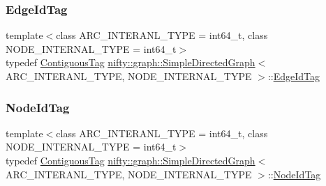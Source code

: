 \subsubsection{\texorpdfstring{Edge\+Id\+Tag}{EdgeIdTag}}
{\footnotesize\ttfamily template$<$class A\+R\+C\+\_\+\+I\+N\+T\+E\+R\+A\+N\+L\+\_\+\+T\+Y\+PE  = int64\+\_\+t, class N\+O\+D\+E\+\_\+\+I\+N\+T\+E\+R\+N\+A\+L\+\_\+\+T\+Y\+PE  = int64\+\_\+t$>$ \\
typedef \hyperlink{structnifty_1_1graph_1_1ContiguousTag}{Contiguous\+Tag} \hyperlink{classnifty_1_1graph_1_1SimpleDirectedGraph}{nifty\+::graph\+::\+Simple\+Directed\+Graph}$<$ A\+R\+C\+\_\+\+I\+N\+T\+E\+R\+A\+N\+L\+\_\+\+T\+Y\+PE, N\+O\+D\+E\+\_\+\+I\+N\+T\+E\+R\+N\+A\+L\+\_\+\+T\+Y\+PE $>$\+::\hyperlink{classnifty_1_1graph_1_1SimpleDirectedGraph_ad0523e96e29a6feae5c9c003c2dc9e37}{Edge\+Id\+Tag}}

\mbox{\label{classnifty_1_1graph_1_1SimpleDirectedGraph_a32f9f0f4beaa2cada708f8a51189a96b}} 
\subsubsection{\texorpdfstring{Node\+Id\+Tag}{NodeIdTag}}
{\footnotesize\ttfamily template$<$class A\+R\+C\+\_\+\+I\+N\+T\+E\+R\+A\+N\+L\+\_\+\+T\+Y\+PE  = int64\+\_\+t, class N\+O\+D\+E\+\_\+\+I\+N\+T\+E\+R\+N\+A\+L\+\_\+\+T\+Y\+PE  = int64\+\_\+t$>$ \\
typedef \hyperlink{structnifty_1_1graph_1_1ContiguousTag}{Contiguous\+Tag} \hyperlink{classnifty_1_1graph_1_1SimpleDirectedGraph}{nifty\+::graph\+::\+Simple\+Directed\+Graph}$<$ A\+R\+C\+\_\+\+I\+N\+T\+E\+R\+A\+N\+L\+\_\+\+T\+Y\+PE, N\+O\+D\+E\+\_\+\+I\+N\+T\+E\+R\+N\+A\+L\+\_\+\+T\+Y\+PE $>$\+::\hyperlink{classnifty_1_1graph_1_1SimpleDirectedGraph_a32f9f0f4beaa2cada708f8a51189a96b}{Node\+Id\+Tag}}

\mbox{\label{classnifty_1_1graph_1_1SimpleDirectedGraph_a50b05474da6846da32398e01be9e3d30}} 
